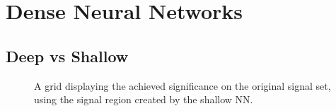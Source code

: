 \section{Dense Neural Networks}
\subsection{Deep vs Shallow}
\begin{figure}
    \caption{A grid displaying the achieved significance on the original signal set, using the signal region 
    created by the shallow \ac{NN}.}
    \label{fig:NNshallowGridSig}
\end{figure}
